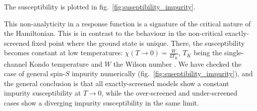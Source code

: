 \documentclass[reprint,prb,superscriptaddress]{revtex4-2}
\begin{document}
The susceptibility is plotted in fig.~\ref{fig:suseptibility_impurity}.

This non-analyticity in a response function is a signature of the critical nature of the Hamiltonian. This is in contrast to the behaviour in the non-critical exactly-screened fixed point where the ground state is unique. There, the susceptibility becomes constant at low temperatures: \(\chi(T\to 0) = \frac{W}{4 T_K}\), \(T_K\) being the single-channel Kondo temperature and \(W\) the Wilson number \cite{wilson1975renormalization,nozieres1974fermi,bullaNRGreview,kondo_urg}. We have checked the case of general spin-\(S\) impurity numerically (fig.~\ref{fig:suseptibility_impurity}), and the general conclusion is that all exactly-screened models show a constant impurity susceptibility at \(T \to 0\), while the over-screened and under-screened cases show a diverging impurity susceptibility in the same limit. 
\end{document}
